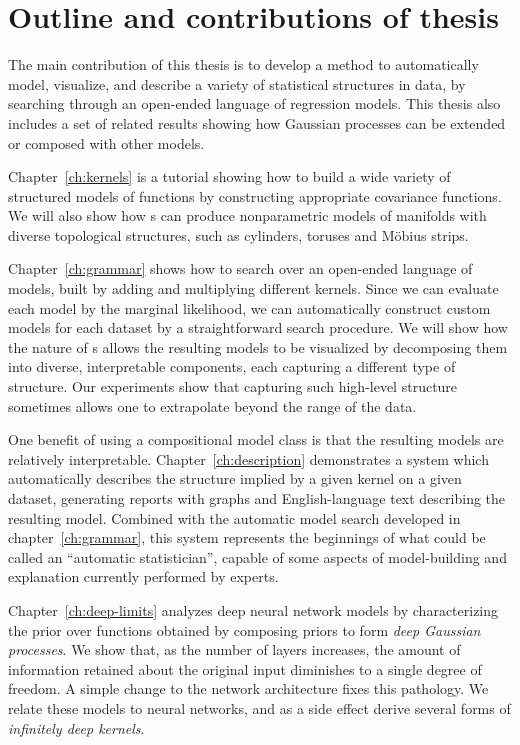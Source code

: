\section{Outline and contributions of thesis}

The main contribution of this thesis is to develop a method to automatically model, visualize, and describe a variety of statistical structures in data, by searching through an open-ended language of regression models.
This thesis also includes a set of related results showing how Gaussian processes can be extended or composed with other models.

Chapter~\ref{ch:kernels} is a tutorial showing how to build a wide variety of structured models of functions by constructing appropriate covariance functions.
We will also show how \gp{}s can produce nonparametric models of manifolds with diverse topological structures, such as cylinders, toruses and M\"obius strips.

Chapter~\ref{ch:grammar} shows how to search over an open-ended language of models, built by adding and multiplying different kernels.
Since we can evaluate each model by the marginal likelihood, we can automatically construct custom models for each dataset by a straightforward search procedure.
We will show how the nature of \gp{}s allows the resulting models to be visualized by decomposing them into diverse, interpretable components, each capturing a different type of structure.
Our experiments show that capturing such high-level structure sometimes allows one to extrapolate beyond the range of the data.

One benefit of using a compositional model class is that the resulting models are relatively interpretable.
Chapter~\ref{ch:description} demonstrates a system which automatically describes the structure implied by a given kernel on a given dataset, generating reports with graphs and English-language text describing the resulting model.
Combined with the automatic model search developed in chapter~\ref{ch:grammar}, this system represents the beginnings of what could be called an ``automatic statistician'', capable of some aspects of model-building and explanation currently performed by experts.

Chapter~\ref{ch:deep-limits} analyzes deep neural network models by characterizing the prior over functions obtained by composing \gp{} priors to form \emph{deep Gaussian processes}.
We show that, as the number of layers increases, the amount of information retained about the original input diminishes to a single degree of freedom.
A simple change to the network architecture fixes this pathology.
We relate these models to neural networks, and as a side effect derive several forms of \emph{infinitely deep kernels}.


